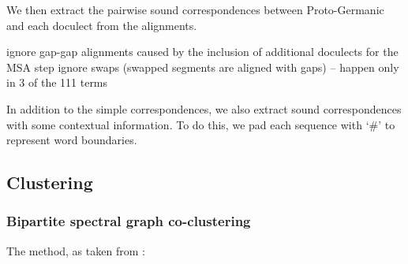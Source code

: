 \documentclass{article}
\begin{document}
We then extract the pairwise sound correspondences between Proto-Germanic and each doculect from the alignments.

ignore gap-gap alignments caused by the inclusion of additional doculects for the MSA step
ignore swaps (swapped segments are aligned with gaps) -- happen only in 3 of the 111 terms

In addition to the simple correspondences, we also extract sound correspondences with some contextual information.
To do this, we pad each sequence with `\#' to represent word boundaries.


\subsection{Clustering}

\subsubsection{Bipartite spectral graph co-clustering}

The method, as taken from \citet{dhillon2001co-clustering}:
\end{document}
